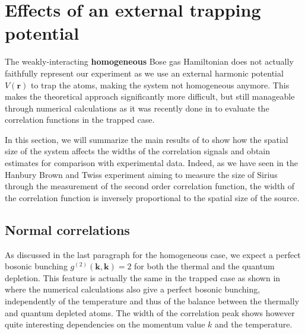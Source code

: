 \section{Effects of an external trapping potential}

\label{sec:width_correlation_theo}
  
The weakly-interacting \textbf{homogeneous} Bose gas Hamiltonian does not actually faithfully represent our experiment as we use an external harmonic potential $V(\bm{r})$ to trap the atoms, making the system not homogeneous anymore. This makes the theoretical approach significantly more difficult, but still manageable through numerical calculations as it was recently done in \cite{butera2020} to evaluate the correlation functions in the trapped case.

In this section, we will summarize the main results of \cite{butera2020} to show how the spatial size of the system affects the widths of the correlation signals and obtain estimates for comparison with experimental data. Indeed, as we have seen in the Hanbury Brown and Twiss experiment aiming to measure the size of Sirius through the measurement of the second order correlation function, the width of the correlation function is inversely proportional to the spatial size of the source. 

\subsection{Normal correlations}

\label{sec:width_normal_theo}

As discussed in the last paragraph for the homogeneous case, we expect a perfect bosonic bunching $g^{(2)}(\bm{k},\bm{k})=2$ for both the thermal and the quantum depletion. This feature is actually the same in the trapped case as shown in \cite{butera2020} where the numerical calculations also give a perfect bosonic bunching, independently of the temperature and thus of the balance between the thermally and quantum depleted atoms. The width of the correlation peak shows however quite interesting dependencies on the momentum value $k$ and the temperature.

